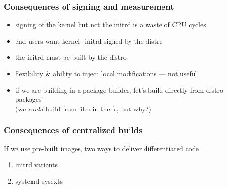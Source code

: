 \documentclass[]{beamer}
\newcommand\pp{}
\begin{document}
\begin{frame}
  \frametitle{Consequences of signing and measurement}

  \pp
  \begin{itemize}
  \item signing of the kernel but not the initrd is a waste of CPU cycles \pp\\
  \item end-users want kernel+initrd signed by the distro \pp\\
  \item the initrd must be built by the distro \pp\\
  \item flexibility \& ability to inject local modifications — not useful \pp\\

    \quad

  \item if we are building in a package builder, let's build directly from distro packages\\
    (we \textit{could} build from files in the fs, but why?)
  \end{itemize}
\end{frame}

\begin{frame}
  \frametitle{Consequences of centralized builds}

  If we use pre-built images, two ways to deliver differentiated code
  \pp

  \begin{enumerate}
  \item initrd variants\pp
  \item systemd-sysexts
  \end{enumerate}
\end{frame}




\end{document}
